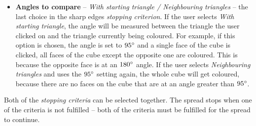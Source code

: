 \begin{itemize}
\item \textbf{Angles to compare} -- \textit{With starting triangle / Neighbouring triangles} -- the last choice in the sharp edges \textit{stopping criterion}. If the user selects \textit{With starting triangle}, the angle will be measured between the triangle the user clicked on and the triangle currently being coloured. For example, if this option is chosen, the angle is set to $95\degree$ and a single face of the cube is clicked, all faces of the cube except the opposite one are coloured. This is because the opposite face is at an $180\degree$ angle. If the user selects \textit{Neighbouring triangles} and uses the $95\degree$ setting again, the whole cube will get coloured, because there are no faces on the cube that are at an angle greater than $95\degree$.

\end{itemize}

Both of the \textit{stopping criteria} can be selected together. The spread stops when one of the criteria is not fulfilled -- both of the criteria must be fulfilled for the spread to continue.